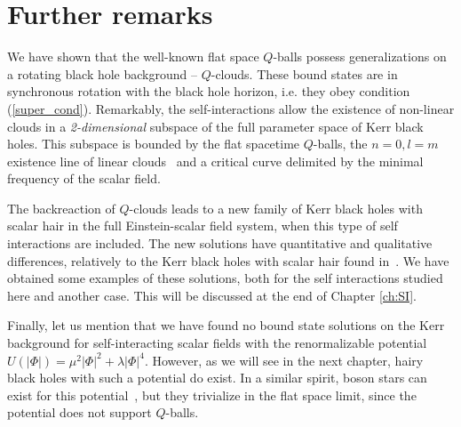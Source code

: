  
 
\section{Further remarks} 

We have shown that
the well-known flat space $Q$-balls 
possess generalizations on a rotating black hole background -- $Q$-clouds. These bound states are 
in synchronous rotation with the black hole horizon, i.e. they obey condition (\ref{super_cond}).
Remarkably,
the self-interactions allow the existence of non-linear clouds 
in a \textit{2-dimensional} subspace of the full parameter space of Kerr black holes.
%
This subspace is bounded by the flat spacetime $Q$-balls,
the  $n=0,l=m$ existence line of linear clouds~\cite{Benone:2014ssa}
and a critical curve delimited by the minimal frequency of the scalar field.
 
The backreaction of $Q$-clouds leads to a new family of Kerr black holes with scalar hair in the full Einstein-scalar field system, when this type of self interactions are included. The new solutions have quantitative and qualitative differences, relatively to the Kerr black holes with scalar hair found in~\cite{Herdeiro:2014goa}. We have obtained some examples of these solutions, both for the self interactions studied here and another case.
This will be discussed at the end of Chapter \ref{ch:SI}.

Finally, let us mention that we have found no bound state solutions on the Kerr background for self-interacting scalar fields with the renormalizable potential $U(|\Phi|) =  \mu^2 |\Phi|^2+\lambda |\Phi|^4$.
However, as we will see in the next chapter, hairy black holes with such a potential do exist.
In a similar spirit,  boson stars can exist for this potential~\cite{Colpi:1986ye,Schunck:2003kk},  but they trivialize in the flat space limit, since the potential does not support $Q$-balls. 
